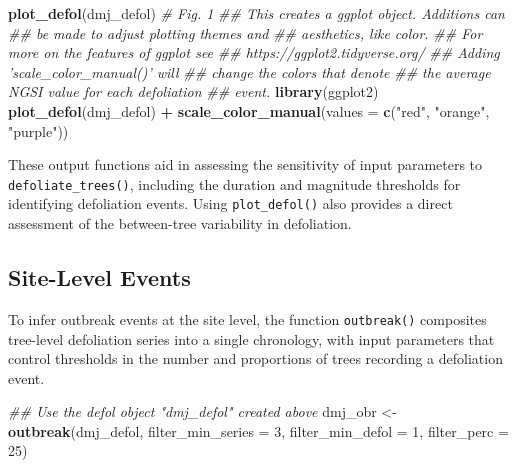 \documentclass[review]{elsarticle} %
\newenvironment{Shaded}{\begin{snugshade}}{\end{snugshade}}
\newcommand{\CommentTok}[1]{\textcolor[rgb]{0.56,0.35,0.01}{\textit{#1}}}
\newcommand{\DataTypeTok}[1]{\textcolor[rgb]{0.13,0.29,0.53}{#1}}
\newcommand{\DecValTok}[1]{\textcolor[rgb]{0.00,0.00,0.81}{#1}}
\newcommand{\KeywordTok}[1]{\textcolor[rgb]{0.13,0.29,0.53}{\textbf{#1}}}
\newcommand{\NormalTok}[1]{#1}
\newcommand{\OperatorTok}[1]{\textcolor[rgb]{0.81,0.36,0.00}{\textbf{#1}}}
\newcommand{\StringTok}[1]{\textcolor[rgb]{0.31,0.60,0.02}{#1}}
\begin{document}
\begin{Shaded}
\begin{Highlighting}[]
\KeywordTok{plot_defol}\NormalTok{(dmj_defol) }\CommentTok{# Fig. 1}
\CommentTok{## This creates a ggplot object. Additions can }
\CommentTok{## be made to adjust plotting themes and}
\CommentTok{## aesthetics, like color.   }
\CommentTok{## For more on the features of ggplot see}
\CommentTok{## https://ggplot2.tidyverse.org/}
\CommentTok{## Adding 'scale_color_manual()' will}
\CommentTok{## change the colors that denote }
\CommentTok{## the average NGSI value for each defoliation}
\CommentTok{## event.}
\KeywordTok{library}\NormalTok{(ggplot2)}
\KeywordTok{plot_defol}\NormalTok{(dmj_defol) }\OperatorTok{+}
\StringTok{  }\KeywordTok{scale_color_manual}\NormalTok{(}\DataTypeTok{values =} \KeywordTok{c}\NormalTok{(}\StringTok{"red"}\NormalTok{, }\StringTok{"orange"}\NormalTok{, }
                                \StringTok{"purple"}\NormalTok{))}
\end{Highlighting}
\end{Shaded}

These output functions aid in assessing the sensitivity of input parameters to \texttt{defoliate\_trees()}, including the duration and magnitude thresholds for identifying defoliation events. Using \texttt{plot\_defol()} also provides a direct assessment of the between-tree variability in defoliation.

\hypertarget{site-level-events}{%
\subsection{Site-Level Events}\label{site-level-events}}

To infer outbreak events at the site level, the function \texttt{outbreak()} composites tree-level defoliation series into a single chronology, with input parameters that control thresholds in the number and proportions of trees recording a defoliation event.

\begin{Shaded}
\begin{Highlighting}[]
\CommentTok{## Use the defol object "dmj_defol" created above}
\NormalTok{dmj_obr <-}\StringTok{ }\KeywordTok{outbreak}\NormalTok{(dmj_defol,}
                    \DataTypeTok{filter_min_series =} \DecValTok{3}\NormalTok{,}
                    \DataTypeTok{filter_min_defol =} \DecValTok{1}\NormalTok{,}
                    \DataTypeTok{filter_perc =} \DecValTok{25}\NormalTok{)}
\end{Highlighting}
\end{Shaded}
\end{document}
